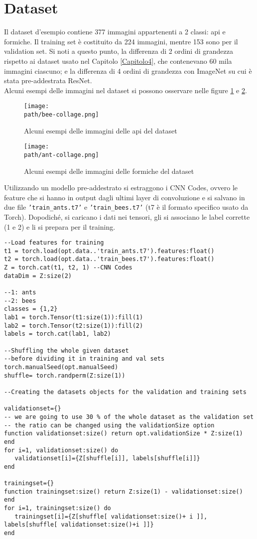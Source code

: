 \section{Dataset}
Il dataset d'esempio contiene 377 immagini appartenenti a 2 classi: api e formiche. Il training set è costituito da 224 immagini, mentre 153 sono per il validation set. Si noti a questo punto, la differenza di 2 ordini di grandezza rispetto ai dataset usato nel Capitolo \ref{Capitolo4}, che contenevano 60 mila immagini ciascuno; e la differenza di 4 ordini di grandezza con ImageNet su cui è stata pre-addestrata ResNet. \\
Alcuni esempi delle immagini nel dataset si possono osservare nelle figure \ref{fig:bee} e \ref{fig:ant}. 
\begin{figure}[h!]
 \centering
 \texttt{[image: \\path/bee-collage.png]} 
 \caption{Alcuni esempi delle immagini delle api del dataset}
 \label{fig:bee}
\end{figure}
\begin{figure}[h!]
 \centering
 \texttt{[image: \\path/ant-collage.png]} 
 \caption{Alcuni esempi delle immagini delle formiche del dataset}
 \label{fig:ant}
\end{figure}

Utilizzando un modello pre-addestrato si estraggono i CNN Codes, ovvero le feature che si hanno in output dagli ultimi layer di convoluzione e si salvano in due file \texttt{'train\_ants.t7'} e \texttt{'train\_bees.t7'} (t7 è il formato specifico usato da Torch). Dopodiché, si caricano i dati nei tensori, gli si associano le label corrette (1 e 2) e li si prepara per il training. 


\begin{lstlisting}[language={[5.2]Lua}]
--Load features for training
t1 = torch.load(opt.data..'train_ants.t7').features:float()
t2 = torch.load(opt.data..'train_bees.t7').features:float()
Z = torch.cat(t1, t2, 1) --CNN Codes
dataDim = Z:size(2)

--1: ants
--2: bees
classes = {1,2}
lab1 = torch.Tensor(t1:size(1)):fill(1)
lab2 = torch.Tensor(t2:size(1)):fill(2)
labels = torch.cat(lab1, lab2)

--Shuffling the whole given dataset 
--before dividing it in training and val sets
torch.manualSeed(opt.manualSeed)
shuffle= torch.randperm(Z:size(1))

--Creating the datasets objects for the validation and training sets

validationset={}
-- we are going to use 30 % of the whole dataset as the validation set
-- the ratio can be changed using the validationSize option
function validationset:size() return opt.validationSize * Z:size(1) end
for i=1, validationset:size() do
   validationset[i]={Z[shuffle[i]], labels[shuffle[i]]}
end

trainingset={}
function trainingset:size() return Z:size(1) - validationset:size() end
for i=1, trainingset:size() do
   trainingset[i]={Z[shuffle[ validationset:size()+ i ]], labels[shuffle[ validationset:size()+i ]]}
end
\end{lstlisting}



